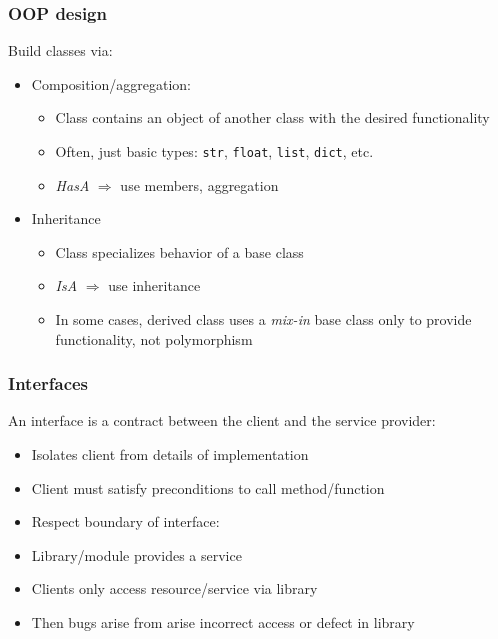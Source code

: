 \documentclass[table,dvipsnames]{beamer}
\begin{document}
\begin{frame}[fragile]
 \frametitle{OOP design}

Build classes via:
\begin{itemize}
    \item Composition/aggregation:
        \begin{itemize}
            \item Class contains an object of another class with the desired functionality
            \item Often, just basic types: \texttt{str}, \texttt{float}, \texttt{list}, \texttt{dict}, etc.
            \item \textit{HasA} $\Rightarrow$ use members, aggregation
        \end{itemize}

  \item Inheritance
        \begin{itemize}
            \item Class specializes behavior of a base class
            \item \textit{IsA} $\Rightarrow$ use inheritance
            \item In some cases, derived class uses  a \textit{mix-in} base class only to provide functionality, not polymorphism
        \end{itemize}
\end{itemize}
\end{frame}
    
\begin{frame}[fragile]
 \frametitle{Interfaces}

\begin{block}{} 
 An interface is a contract between the client and the service provider:
\end{block}

\begin{itemize}
    \item Isolates client from details of implementation
    \item Client must satisfy preconditions to call method/function
    \item  Respect boundary of interface:
\end{itemize}

\begin{itemize}
    \item Library/module provides a service
    \item Clients only access resource/service via library
    \item Then bugs arise from arise incorrect access or defect in library
\end{itemize}
\end{frame}
\end{document}
